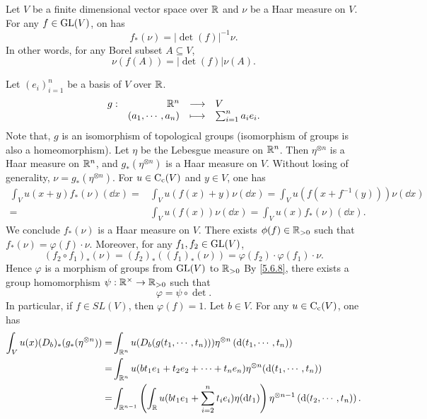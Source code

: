 \begin{theoremenv}\label{thm:5.6.9}
    Let $V$ be a finite dimensional vector space over $\mathbb{R}$ and $\nu$ be a Haar measure on $V$.
    For any $f \in \operatorname{\mathrm{GL}}(V)$, on has 
    $$f_*(\nu) = \left| \det(f)\right|^{-1} \nu.$$
    In other words, for any Borel subset $A \subseteq V$,
    $$\nu(f(A)) = \left| \det(f)\right| \nu(A).$$
\end{theoremenv}
\begin{proofenv}
    Let $(e_i)_{i=1}^n$ be a basis of $V$ over $\mathbb{R}$.
    $$\begin{array}{rrcl}
        g : & \mathbb{R}^n  & \longrightarrow & V\\
        & (a_1,\cdots,a_n) & \longmapsto & \sum_{i=1}^{n} a_i e_i.
    \end{array}$$
    Note that, $g$ is an isomorphism of topological groups (isomorphism of groups is also a homeomorphism).
    Let $\eta$ be the Lebesgue measure on $\mathbb{R}^n$.
    Then $\eta^{\otimes n}$ is a Haar measure on $\mathbb{R}^n$,
    and $g_*(\eta^{\otimes n})$ is a Haar measure on $V$.
    Without losing of generality, $\nu = g_*(\eta^{\otimes n})$.
    For $u \in \operatorname{C_{c}}(V)$ and $y \in V$, one has
    $$\begin{aligned}
        \int_{V} u(x + y)f_*(\nu)(\dd x) = & \int_{V} u(f(x) + y) \nu(\dd x) = \int_{V} u(f(x + f^{-1}(y))) \nu(\dd x)\\
        = & \int_{V} u(f(x)) \nu(\dd x) = \int_{V} u(x)f_*(\nu)(\dd x).
    \end{aligned}$$
    We conclude $f_*(\nu)$ is a Haar measure on $V$.
    There exists $\phi(f) \in \mathbb{R}_{>0}$ such that $f_*(\nu) = \varphi(f) \cdot \nu$.
    Moreover, for any $f_1,f_2 \in \operatorname{\mathrm{GL}}(V)$,
    $$\left(f_2 \circ f_1\right)_* (\nu) = \left(f_2\right)_*\left((f_1)_*(\nu)\right) = \varphi(f_2) \cdot \varphi(f_1) \cdot \nu.$$
    Hence $\varphi$ is a morphism of groups from $\operatorname{\mathrm{GL}}(V)$ to $\mathbb{R}_{>0}$
    By \ref{5.6.8}, there exists a group homomorphism $\psi : \mathbb{R}^\times \rightarrow \mathbb{R}_{>0}$ such that
    $$\varphi = \psi \circ \det.$$
    In particular, if $f \in SL(V)$, then $\varphi(f) = 1$.
    Let $b \in V$.
    For any $u \in \operatorname{C_{c}}(V)$, one has 
    $$\begin{aligned}
        \int_{V} u(x) (D_{b})_* (g_*(\eta^{\otimes n})) = & \int_{\mathbb{R}^n} u(D_b(g(t_1,\cdots,t_n)))\eta^{\otimes n} \left(\mathrm{d} (t_1,\cdots,t_n)\right)\\
        = & \int_{\mathbb{R}^n} u(bt_1e_1 + t_2e_2 + \cdots + t_n e_n)\eta^{\otimes n}(\mathrm{d} (t_1,\cdots,t_n))\\
        = & \int_{\mathbb{R}^{n-1}}\left(\int_{\mathbb{R}} u(bt_1e_1 + \sum_{i=2}^{n}t_ie_i)\eta(\mathrm{d} t_1)\right) \eta^{\otimes n-1} \left(\mathrm{d} (t_2,\cdots,t_n)\right).
    \end{aligned}$$
\end{proofenv}

